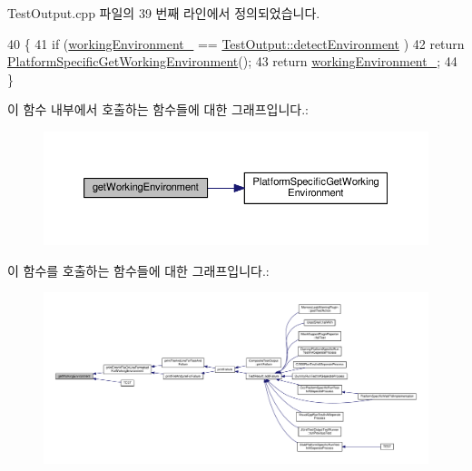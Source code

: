 Test\+Output.\+cpp 파일의 39 번째 라인에서 정의되었습니다.


\begin{DoxyCode}
40 \{
41     \textcolor{keywordflow}{if} (\hyperlink{class_test_output_a8b622cfce4b95599cd31b61a777d68ef}{workingEnvironment\_} == \hyperlink{class_test_output_a0541851f863713454486a9fb3080f766a3f11f791db94db142e33c3c75442ed10}{TestOutput::detectEnvironment}
      )
42         \textcolor{keywordflow}{return} \hyperlink{_platform_specific_functions_8h_a158e08df89f2edf2f29333d6026979b1}{PlatformSpecificGetWorkingEnvironment}();
43     \textcolor{keywordflow}{return} \hyperlink{class_test_output_a8b622cfce4b95599cd31b61a777d68ef}{workingEnvironment\_};
44 \}
\end{DoxyCode}


이 함수 내부에서 호출하는 함수들에 대한 그래프입니다.\+:
\nopagebreak
\begin{figure}[H]
\begin{center}
\leavevmode
\includegraphics[width=350pt]{class_test_output_a90d5028d0f7f6f41ca2dced042a8709d_cgraph}
\end{center}
\end{figure}




이 함수를 호출하는 함수들에 대한 그래프입니다.\+:
\nopagebreak
\begin{figure}[H]
\begin{center}
\leavevmode
\includegraphics[width=350pt]{class_test_output_a90d5028d0f7f6f41ca2dced042a8709d_icgraph}
\end{center}
\end{figure}



